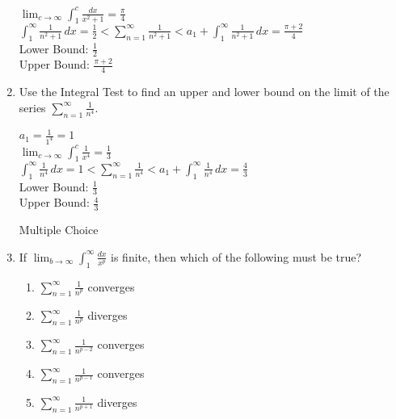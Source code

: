 \documentclass[10pt,letterpaper]{report}
\begin{document}
\begin{enumerate}
    $\lim_{c\to\infty}\int_{1}^{c}{\frac{dx}{x^{2}+1}} = \frac{\pi}{4}$ \\
    
    $\int_{1}^{\infty}{\frac{1}{n^{2}+1}}\,dx = \frac{1}{2} < \sum_{n=1}^{\infty}{\frac{1}{n^{2}+1}} < a_{1} + \int_{1}^{\infty}{\frac{1}{n^{2}+1}}\,dx = \frac{\pi + 2}{4}$ \\
    
    Lower Bound: $\frac{1}{2}$ \\
    
    Upper Bound: $\frac{\pi + 2}{4}$ \\
    
  \item{Use the Integral Test to find an upper and lower bound on the limit of the series $\sum_{n=1}^{\infty}{\frac{1}{n^{4}}}$. \\}
  
    $a_{1} = \frac{1}{1^{4}} = 1$ \\
  
    $\lim_{c\to\infty}\int_{1}^{c}{\frac{1}{x^{4}}} = \frac{1}{3}$ \\
    
    $\int_{1}^{\infty}{\frac{1}{n^{4}}}\,dx = 1 < \sum_{n=1}^{\infty}{\frac{1}{n^{4}}} < a_{1} + \int_{1}^{\infty}{\frac{1}{n^{4}}}\,dx = \frac{4}{3}$ \\
    
    Lower Bound: $\frac{1}{3}$ \\
    
    Upper Bound: $\frac{4}{3}$ \\
    
  \hline
  
  \noindent Multiple Choice \\
  
  \item{If $\lim_{b\to\infty}\int_{1}^{\infty}{\frac{dx}{x^{p}}}$ is finite, then which of the following must be true?}
  \begin{enumerate}
    \item{$\sum_{n=1}^{\infty}{\frac{1}{n^{p}}}$ converges \\}
    \item{$\sum_{n=1}^{\infty}{\frac{1}{n^{p}}}$ diverges \\}
    \item{$\sum_{n=1}^{\infty}{\frac{1}{n^{p-2}}}$ converges \\}
    \item{$\sum_{n=1}^{\infty}{\frac{1}{n^{p-1}}}$ converges \\}
    \item{$\sum_{n=1}^{\infty}{\frac{1}{n^{p+1}}}$ diverges \\}
  \end{enumerate}
    

\end{enumerate}
\end{document}

